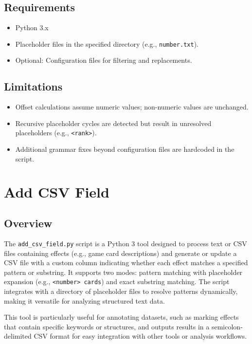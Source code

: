 \subsection{Requirements}
\begin{itemize}
    \item Python 3.x
    \item Placeholder files in the specified directory (e.g., \texttt{number.txt}).
    \item Optional: Configuration files for filtering and replacements.
\end{itemize}

\subsection{Limitations}
\begin{itemize}
    \item Offset calculations assume numeric values; non-numeric values are unchanged.
    \item Recursive placeholder cycles are detected but result in unresolved placeholders (e.g., \texttt{<rank>}).
    \item Additional grammar fixes beyond configuration files are hardcoded in the script.
\end{itemize}








\section{Add CSV Field}
\subsection{Overview}
The \texttt{add\_csv\_field.py} script is a Python 3 tool designed to process text or CSV files containing effects (e.g., game card descriptions) and generate or update a CSV file with a custom column indicating whether each effect matches a specified pattern or substring. It supports two modes: pattern matching with placeholder expansion (e.g., \texttt{<number> cards}) and exact substring matching. The script integrates with a directory of placeholder files to resolve patterns dynamically, making it versatile for analyzing structured text data.

This tool is particularly useful for annotating datasets, such as marking effects that contain specific keywords or structures, and outputs results in a semicolon-delimited CSV format for easy integration with other tools or analysis workflows.

